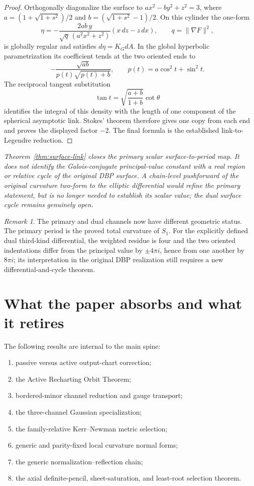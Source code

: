 \documentclass[11pt]{article}
\theoremstyle{remark}
\newtheorem{remark}[theorem]{Remark}
\newcommand{\proofstop}[1]{\par\medskip\noindent{\color{red!75!black}\textbf{STOP--PROOF.}} \textit{#1}\par\medskip}
\begin{document}
\begin{proof}
Orthogonally diagonalize the surface to
$ax^2-by^2+z^2=3$, where
$a=(1+\sqrt{1+s^2})/2$ and
$b=(\sqrt{1+s^2}-1)/2$.  On this cylinder the one-form
\[
\eta=-\frac{2ab\,y}{\sqrt q\,(a^2x^2+z^2)}
(x\,dz-z\,dx),\qquad q=\lVert\nabla F\rVert^2,
\]
is globally regular and satisfies $d\eta=K_GdA$.  In the global
hyperbolic parametrization its coefficient tends at the two oriented
ends to
\[
-\frac{\sqrt{ab}}{p(t)\sqrt{p(t)+b}},
\qquad p(t)=a\cos^2t+\sin^2t.
\]
The reciprocal tangent substitution
\[
\tan t=\sqrt{\frac{a+b}{1+b}}\cot\theta
\]
identifies the integral of this density with the length of one component
of the spherical asymptotic link.  Stokes' theorem therefore gives one
copy from each end and proves the displayed factor $-2$.  The final
formula is the established link-to-Legendre reduction.
\end{proof}

\proofstop{Theorem~\ref{thm:surface-link} closes the primary scalar
surface-to-period map. It does not identify the Galois-conjugate
principal-value constant with a real region or relative cycle of the
original DBP surface. A chain-level pushforward of the original curvature
two-form to the elliptic differential would refine the primary statement,
but is no longer needed to establish its scalar value; the dual surface
cycle remains genuinely open.}

\begin{remark}
The primary and dual channels now have different geometric status.  The
primary period is the proved total curvature of $S_1$.  For the explicitly
defined dual third-kind differential, the weighted residue is four and the
two oriented indentations differ from the principal value by $\pm4\pi i$,
hence from one another by $8\pi i$; its interpretation in the original DBP
realization still requires a new differential-and-cycle theorem.
\end{remark}

\section{What the paper absorbs and what it retires}

The following results are internal to the main spine:
\begin{enumerate}
\item passive versus active output-chart correction;
\item the Active Recharting Orbit Theorem;
\item bordered-minor channel reduction and gauge transport;
\item the three-channel Gaussian specialization;
\item the family-relative Kerr--Newman metric selection;
\item generic and parity-fixed local curvature normal forms;
\item the generic normalization--reflection chain;
\item the axial definite-pencil, sheet-saturation, and least-root
selection theorem.
\end{enumerate}
\end{document}
